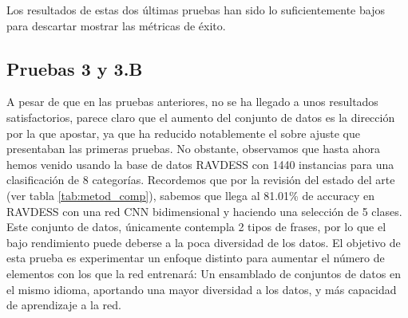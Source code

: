 \documentclass[11pt,a4paper,spanish]{book}
\begin{document}
	Los resultados de estas dos últimas pruebas han sido lo suficientemente bajos para descartar mostrar las métricas de éxito.
	
	\subsection{Pruebas 3 y 3.B} %
	A pesar de que en las pruebas anteriores, no se ha llegado a unos resultados satisfactorios, parece claro que el aumento del conjunto de datos es la dirección por la que apostar, ya que ha reducido notablemente el sobre ajuste que presentaban las primeras pruebas. No obstante, observamos que hasta ahora hemos venido usando la base de datos RAVDESS con 1440 instancias para una clasificación de 8 categorías. Recordemos que por la revisión del estado del arte (ver tabla \ref{tab:metod_comp}), sabemos que \cite{Mustaqeem2020} llega al 81.01\% de accuracy en RAVDESS con una red CNN bidimensional y haciendo una selección de 5 clases. Este conjunto de datos, únicamente contempla 2 tipos de frases, por lo que el bajo rendimiento puede deberse a la poca diversidad de los datos. 
	El objetivo de esta prueba es experimentar un enfoque distinto para aumentar el número de elementos con los que la red entrenará: Un ensamblado de conjuntos de datos en el mismo idioma, aportando una mayor diversidad a los datos, y más capacidad de aprendizaje a la red.
\end{document}
